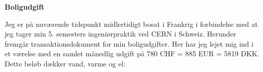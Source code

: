 \documentclass[../Ansoegning.tex]{subfiles}
\begin{document}
\begin{center}
    \textbf{\LARGE{Boligudgift}}\vspace{-3ex}
\end{center}

Jeg er på nuværende tidspunkt midlertidigt bosat i Frankrig i forbindelse med at jeg tager min 5. semesters ingeniørpraktik ved CERN i Schweiz. Herunder fremgår transaktionsdokument for min boligudgifter. Her har jeg lejet mig ind i et værelse med en samlet månedlig udgift på 780 CHF = 885 EUR = 5819 DKK. Dette beløb dækker vand, varme og el: 
\begin{minipage}{1\textwidth}

\end{minipage}
    \newpage
\end{document}
